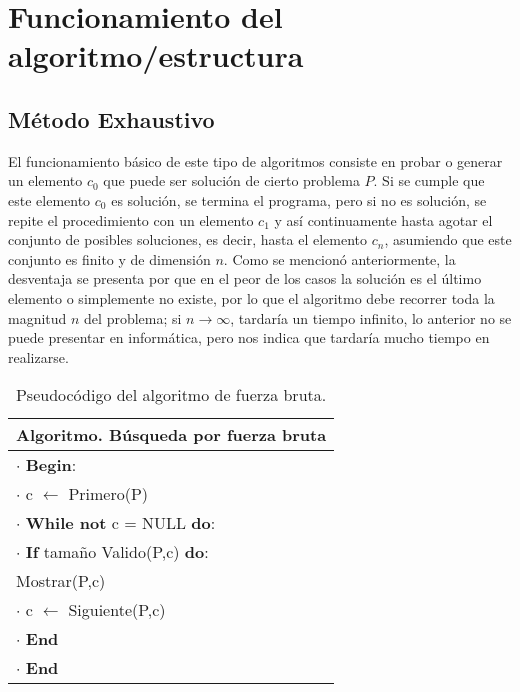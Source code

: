 
\section{Funcionamiento del algoritmo/estructura}

\subsection{Método Exhaustivo}

El funcionamiento básico de este tipo de algoritmos consiste en probar o generar un elemento $c_0$  que puede ser solución de cierto problema $P$. Si se cumple que este elemento $c_0$ es solución, se termina el programa, pero si no es solución, se repite el procedimiento con un elemento $c_1$ y así continuamente hasta agotar el conjunto de posibles soluciones, es decir, hasta el elemento $c_n$, asumiendo que este conjunto es finito y de dimensión $n$. Como se mencionó anteriormente, la desventaja se presenta por que en el peor de los casos la solución es el último elemento o simplemente no existe, por lo que el algoritmo debe recorrer toda la magnitud $n$ del problema; si $n\rightarrow \infty$, tardaría un tiempo infinito, lo anterior no se puede presentar en informática, pero nos indica que tardaría mucho tiempo en realizarse. 

\begin{table}[H]
\centering
\caption{Pseudocódigo del algoritmo de fuerza bruta.}
\label{T:exh}
\begin{tabular}{l}
    \hline
   \cellcolor{lightgray} \textbf{Algoritmo}. Búsqueda por fuerza bruta \\
    \hline
    \hline
     
     $\cdot$ \textbf{Begin}:\\
     \hspace{0.6cm} $\cdot$ c $\leftarrow$ Primero(P)\\
     \hspace{0.6cm} $\cdot$ \textbf{While not} c = NULL \textbf{do}:\\
     \hspace{1.2cm} $\cdot$ \textbf{If} tamaño Valido(P,c) \textbf{do}:\\
     \hspace{1.8cm} Mostrar(P,c) \\\hspace{1.2cm}  $\cdot$  c $\leftarrow$ Siguiente(P,c)\\
     \hspace{0.6cm} $\cdot$ \textbf{End}\\
     $\cdot$ \textbf{End}\\
    \hline
\end{tabular}
\end{table}


